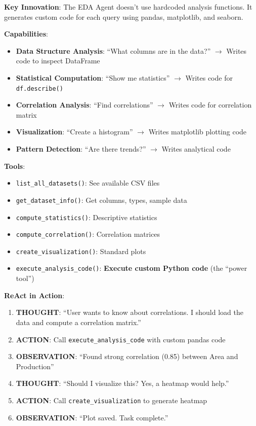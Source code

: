 \documentclass[11pt,a4paper]{article}
\begin{document}
\textbf{Key Innovation}: The EDA Agent doesn't use hardcoded analysis functions. It generates custom code for each query using pandas, matplotlib, and seaborn.

\textbf{Capabilities}:
\begin{itemize}
    \item \textbf{Data Structure Analysis}: ``What columns are in the data?'' $\rightarrow$ Writes code to inspect DataFrame
    \item \textbf{Statistical Computation}: ``Show me statistics'' $\rightarrow$ Writes code for \texttt{df.describe()}
    \item \textbf{Correlation Analysis}: ``Find correlations'' $\rightarrow$ Writes code for correlation matrix
    \item \textbf{Visualization}: ``Create a histogram'' $\rightarrow$ Writes matplotlib plotting code
    \item \textbf{Pattern Detection}: ``Are there trends?'' $\rightarrow$ Writes analytical code
\end{itemize}

\textbf{Tools}:
\begin{itemize}
    \item \texttt{list\_all\_datasets()}: See available CSV files
    \item \texttt{get\_dataset\_info()}: Get columns, types, sample data
    \item \texttt{compute\_statistics()}: Descriptive statistics
    \item \texttt{compute\_correlation()}: Correlation matrices
    \item \texttt{create\_visualization()}: Standard plots
    \item \texttt{execute\_analysis\_code()}: \textbf{Execute custom Python code} (the ``power tool'')
\end{itemize}

\textbf{ReAct in Action}:
\begin{enumerate}
    \item \textbf{THOUGHT}: ``User wants to know about correlations. I should load the data and compute a correlation matrix.''
    \item \textbf{ACTION}: Call \texttt{execute\_analysis\_code} with custom pandas code
    \item \textbf{OBSERVATION}: ``Found strong correlation (0.85) between Area and Production''
    \item \textbf{THOUGHT}: ``Should I visualize this? Yes, a heatmap would help.''
    \item \textbf{ACTION}: Call \texttt{create\_visualization} to generate heatmap
    \item \textbf{OBSERVATION}: ``Plot saved. Task complete.''
\end{enumerate}
\end{document}
